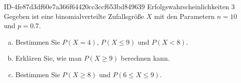 \begin{exercise}
      {ID-4fe87d3df60e7a366f64420cc3ccf653bd849639}
      {Erfolgswahrscheinlichkeiten 3}
  \ifproblem\problem
    Gegeben ist eine binomialverteilte Zufallsgröße $X$ mit den Parametern
    $n=10$ und $p=\num{0.7}$.
    \begin{enumerate}[a)]
      \item Bestimmen Sie $P(X=4)$, $P(X\leq9)$ und $P(X<8)$.
      \item Erklären Sie, wie man $P(X\geq9)$ berechnen kann.
      \item Bestimmen Sie $P(X\geq8)$ und $P(6\leq X\leq9)$.
    \end{enumerate}
  \fi
\end{exercise}
